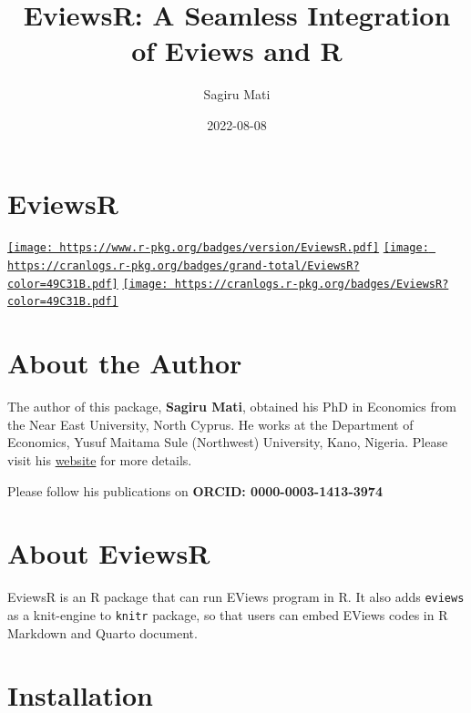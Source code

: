 \documentclass[
  letterpaper,
  DIV=11,
  numbers=noendperiod]{scrartcl}
\title{EviewsR: A Seamless Integration of Eviews and R}
\author{Sagiru Mati}
\date{2022-08-08}
\begin{document}
\maketitle
\ifdefined\Shaded\renewenvironment{Shaded}{\begin{tcolorbox}[sharp corners, enhanced, boxrule=0pt, borderline west={3pt}{0pt}{shadecolor}, breakable, interior hidden, frame hidden]}{\end{tcolorbox}}\fi

\hypertarget{eviewsr}{%
\section{\texorpdfstring{EviewsR }{EviewsR }}\label{eviewsr}}

\href{https://cran.r-project.org/package=EviewsR}{\texttt{[image: https://www.r-pkg.org/badges/version/EviewsR.pdf]}}
\href{https://cranlogs.r-pkg.org/badges/grand-total/EviewsR?color=49C31B}{\texttt{[image: https://cranlogs.r-pkg.org/badges/grand-total/EviewsR?color=49C31B.pdf]}}
\href{https://cranlogs.r-pkg.org/badges/EviewsR?color=49C31B}{\texttt{[image: https://cranlogs.r-pkg.org/badges/EviewsR?color=49C31B.pdf]}}

\hypertarget{about-the-author}{%
\section{About the Author}\label{about-the-author}}

The author of this package, \textbf{Sagiru Mati}, obtained his PhD in
Economics from the Near East University, North Cyprus. He works at the
Department of Economics, Yusuf Maitama Sule (Northwest) University,
Kano, Nigeria. Please visit his \href{https://smati.com.ng}{website} for
more details.

Please follow his publications on \textbf{ORCID: 0000-0003-1413-3974}

\hypertarget{about-eviewsr}{%
\section{About EviewsR}\label{about-eviewsr}}

EviewsR is an R package that can run EViews program in R. It also adds
\texttt{eviews} as a knit-engine to \texttt{knitr} package, so that
users can embed EViews codes in R Markdown and Quarto document.

\hypertarget{installation}{%
\section{Installation}\label{installation}}
\end{document}
